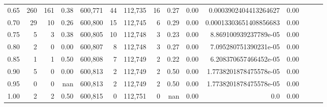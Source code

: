 \begin{tabular}{rrrrrrrrrrrrrrr}
0.65 &      260 &     161 &  0.38 &  600,771 &       44 &  112,735 &       16 &  0.27 &  0.00 &   0.0003902404413264627 &      0.00 \\
0.70 &       29 &      10 &  0.26 &  600,800 &       15 &  112,745 &        6 &  0.29 &  0.00 &  0.00013303651408856683 &      0.00 \\
0.75 &        5 &       3 &  0.38 &  600,805 &       10 &  112,748 &        3 &  0.23 &  0.00 &   8.869100939237789e-05 &      0.00 \\
0.80 &        2 &       0 &  0.00 &  600,807 &        8 &  112,748 &        3 &  0.27 &  0.00 &   7.095280751390231e-05 &      0.00 \\
0.85 &        1 &       1 &  0.50 &  600,808 &        7 &  112,749 &        2 &  0.22 &  0.00 &   6.208370657466452e-05 &      0.00 \\
0.90 &        5 &       0 &  0.00 &  600,813 &        2 &  112,749 &        2 &  0.50 &  0.00 &  1.7738201878475578e-05 &      0.00 \\
0.95 &        0 &       0 &   nan &  600,813 &        2 &  112,749 &        2 &  0.50 &  0.00 &  1.7738201878475578e-05 &      0.00 \\
1.00 &        2 &       2 &  0.50 &  600,815 &        0 &  112,751 &        0 &   nan &  0.00 &                     0.0 &      0.00 \\
\bottomrule
\end{tabular}
